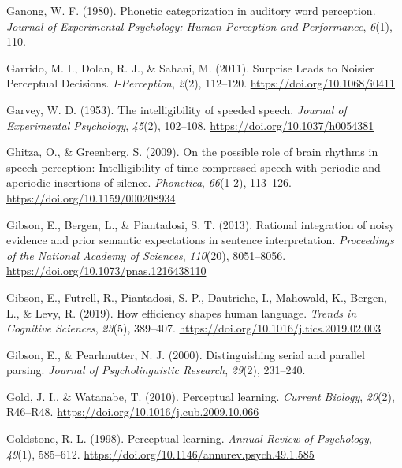 \documentclass[a4paper, nobind]{templates/ociamthesis}
\newlength{\cslhangindent}
\newenvironment{CSLReferences}[2] %
 {%
  \setlength{\parindent}{0pt}
  \ifodd #1
  \let\oldpar\par
  \def\par{\hangindent=\cslhangindent\oldpar}
  \fi
  \setlength{\parskip}{1mm}
  \setlength{\baselineskip}{6mm}
 }%
 {}
\begin{document}
\begin{CSLReferences}{1}{0}
\leavevmode{}%
Ganong, W. F. (1980). Phonetic categorization in auditory word perception. \emph{Journal of Experimental Psychology: Human Perception and Performance}, \emph{6}(1), 110.

\leavevmode{}%
Garrido, M. I., Dolan, R. J., \& Sahani, M. (2011). Surprise Leads to Noisier Perceptual Decisions. \emph{I-Perception}, \emph{2}(2), 112--120. \url{https://doi.org/10.1068/i0411}

\leavevmode{}%
Garvey, W. D. (1953). {The intelligibility of speeded speech}. \emph{Journal of Experimental Psychology}, \emph{45}(2), 102--108. \url{https://doi.org/10.1037/h0054381}

\leavevmode{}%
Ghitza, O., \& Greenberg, S. (2009). {On the possible role of brain rhythms in speech perception: Intelligibility of time-compressed speech with periodic and aperiodic insertions of silence}. \emph{Phonetica}, \emph{66}(1-2), 113--126. \url{https://doi.org/10.1159/000208934}

\leavevmode{}%
Gibson, E., Bergen, L., \& Piantadosi, S. T. (2013). Rational integration of noisy evidence and prior semantic expectations in sentence interpretation. \emph{Proceedings of the National Academy of Sciences}, \emph{110}(20), 8051--8056. \url{https://doi.org/10.1073/pnas.1216438110}

\leavevmode{}%
Gibson, E., Futrell, R., Piantadosi, S. P., Dautriche, I., Mahowald, K., Bergen, L., \& Levy, R. (2019). How efficiency shapes human language. \emph{Trends in Cognitive Sciences}, \emph{23}(5), 389--407. \url{https://doi.org/10.1016/j.tics.2019.02.003}

\leavevmode{}%
Gibson, E., \& Pearlmutter, N. J. (2000). Distinguishing serial and parallel parsing. \emph{Journal of Psycholinguistic Research}, \emph{29}(2), 231--240.

\leavevmode{}%
Gold, J. I., \& Watanabe, T. (2010). Perceptual learning. \emph{Current Biology}, \emph{20}(2), R46--R48. \url{https://doi.org/10.1016/j.cub.2009.10.066}

\leavevmode{}%
Goldstone, R. L. (1998). Perceptual learning. \emph{Annual Review of Psychology}, \emph{49}(1), 585--612. \url{https://doi.org/10.1146/annurev.psych.49.1.585}


\end{CSLReferences}
\end{document}
